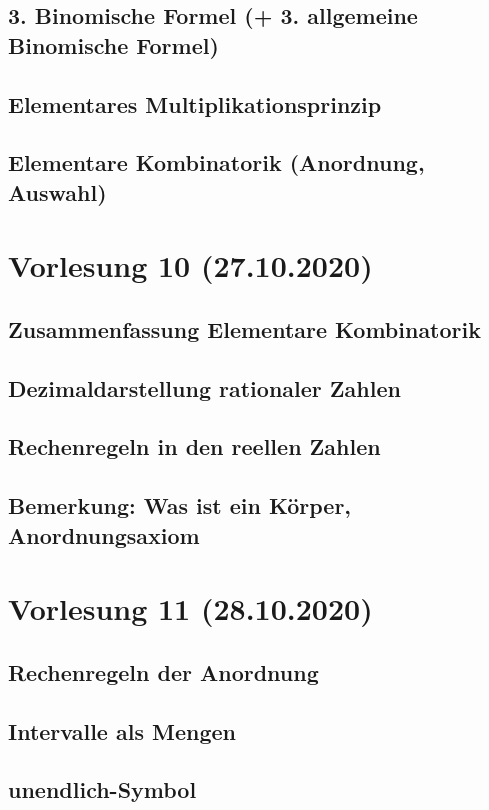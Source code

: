 \documentclass[]{article}
\begin{document}
\subsection{3. Binomische Formel (+ 3. allgemeine Binomische Formel)}
\subsection{Elementares Multiplikationsprinzip}
\subsection{Elementare Kombinatorik (Anordnung, Auswahl)}


\section{Vorlesung 10 (27.10.2020)}
\subsection{Zusammenfassung Elementare Kombinatorik}
\subsection{Dezimaldarstellung rationaler Zahlen}
\subsection{Rechenregeln in den reellen Zahlen}
\subsection{Bemerkung: Was ist ein Körper, Anordnungsaxiom}


\section{Vorlesung 11 (28.10.2020)}
\subsection{Rechenregeln der Anordnung}
\subsection{Intervalle als Mengen}
\subsection{unendlich-Symbol}
\end{document}
